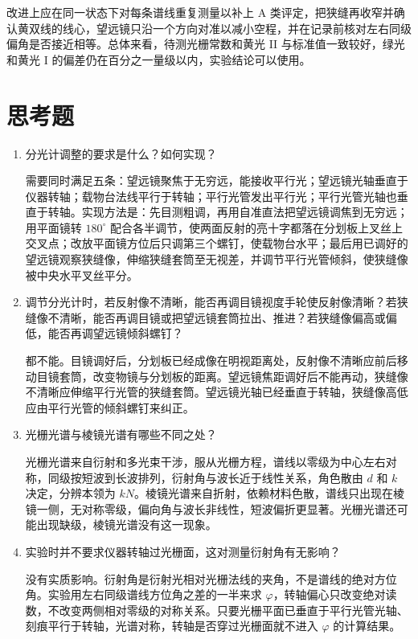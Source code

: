 \documentclass{../template/myrpt}
\begin{document}
改进上应在同一状态下对每条谱线重复测量以补上 A 类评定，把狭缝再收窄并确认黄双线的线心，望远镜只沿一个方向对准以减小空程，并在记录前核对左右同级偏角是否接近相等。总体来看，待测光栅常数和黄光 II 与标准值一致较好，绿光和黄光 I 的偏差仍在百分之一量级以内，实验结论可以使用。

\iffalse
\section{思考题}

\begin{enumerate}[label=\arabic*. ]
  \item 分光计调整的要求是什么？如何实现？

  需要同时满足五条：望远镜聚焦于无穷远，能接收平行光；望远镜光轴垂直于仪器转轴；载物台法线平行于转轴；平行光管发出平行光；平行光管光轴也垂直于转轴。实现方法是：先目测粗调，再用自准直法把望远镜调焦到无穷远；用平面镜转 $180^\circ$ 配合各半调节，使两面反射的亮十字都落在分划板上叉丝上交叉点；改放平面镜方位后只调第三个螺钉，使载物台水平；最后用已调好的望远镜观察狭缝像，伸缩狭缝套筒至无视差，并调节平行光管倾斜，使狭缝像被中央水平叉丝平分。

  \item 调节分光计时，若反射像不清晰，能否再调目镜视度手轮使反射像清晰？若狭缝像不清晰，能否再调目镜或把望远镜套筒拉出、推进？若狭缝像偏高或偏低，能否再调望远镜倾斜螺钉？

  都不能。目镜调好后，分划板已经成像在明视距离处，反射像不清晰应前后移动目镜套筒，改变物镜与分划板的距离。望远镜焦距调好后不能再动，狭缝像不清晰应伸缩平行光管的狭缝套筒。望远镜光轴已经垂直于转轴，狭缝像高低应由平行光管的倾斜螺钉来纠正。

  \item 光栅光谱与棱镜光谱有哪些不同之处？

  光栅光谱来自衍射和多光束干涉，服从光栅方程，谱线以零级为中心左右对称，同级按短波到长波排列，衍射角与波长近于线性关系，角色散由 $d$ 和 $k$ 决定，分辨本领为 $kN$。棱镜光谱来自折射，依赖材料色散，谱线只出现在棱镜一侧，无对称零级，偏向角与波长非线性，短波偏折更显著。光栅光谱还可能出现缺级，棱镜光谱没有这一现象。

  \item 实验时并不要求仪器转轴过光栅面，这对测量衍射角有无影响？

  没有实质影响。衍射角是衍射光相对光栅法线的夹角，不是谱线的绝对方位角。实验用左右同级谱线方位角之差的一半来求 $\varphi$，转轴偏心只改变绝对读数，不改变两侧相对零级的对称关系。只要光栅平面已垂直于平行光管光轴、刻痕平行于转轴，光谱对称，转轴是否穿过光栅面就不进入 $\varphi$ 的计算结果。


\end{enumerate}
\end{document}

